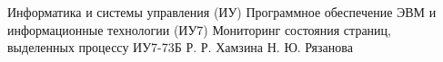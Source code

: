 \documentclass{bmstu}
\begin{document}
\makecourseworktitle
	{Информатика и системы управления (ИУ)}
	{Программное обеспечение ЭВМ и информационные технологии (ИУ7)}
	{Мониторинг состояния страниц,\\выделенных процессу}
	{ИУ7-73Б}
	{Р. Р. Хамзина}
	{Н. Ю. Рязанова}{}{}

\maketableofcontents








\makebibliography


\end{document}
